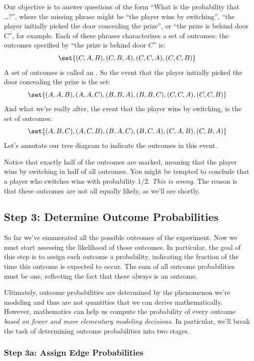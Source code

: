 Our objective is to answer questions of the form ``What is the probability
that \dots ?'', where the missing phrase might be ``the player wins by
switching'', ``the player initially picked the door concealing the
prize'', or ``the prize is behind door C'', for example.  Each of these
phrases characterizes a set of outcomes: the outcomes
specified by ``the prize is behind door $C$'' is:
%
\[
\set{(C, A, B), (C, B, A), (C, C, A), (C, C, B)}
\]
%
A set of outcomes is called an .  So the event that the player
initially picked the door concealing the prize is the set:
%
\[
\set{(A, A, B), (A, A, C), (B, B, A), (B, B, C), (C, C, A), (C, C, B)}
\]
%
And what we're really after, the event that the player wins by
switching, is the set of outcomes:
%
\[
\set{(A, B, C), (A, C, B), (B, A, C), (B, C, A), (C, A, B), (C, B, A)}
\]
%
Let's annotate our tree diagram to indicate the outcomes in this
event.
%
\begin{center}
\end{center}
Notice that exactly half of the outcomes are marked, meaning that the
player wins by switching in half of all outcomes.  You might be
tempted to conclude that a player who switches wins with probability
$1/2$.  \textit{This is wrong.}  The reason is that these
outcomes are not all equally likely, as we'll see shortly.

\subsection{Step 3: Determine Outcome Probabilities}

So far we've enumerated all the possible outcomes of the experiment.  Now
we must start assessing the likelihood of those outcomes.  In particular,
the goal of this step is to assign each outcome a probability, indicating
the fraction of the time this outcome is expected to occur.  The sum of
all outcome probabilities must be one, reflecting the fact that there
always is an outcome.

Ultimately, outcome probabilities are determined by the phenomenon
we're modeling and thus are not quantities that we can derive
mathematically.  However, mathematics can help us compute the
probability of every outcome \textit{based on fewer and more
elementary modeling decisions.}  In particular, we'll break the task
of determining outcome probabilities into two stages.

\subsubsection{Step 3a: Assign Edge Probabilities}

